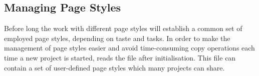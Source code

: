 \subsection{Managing Page Styles}
Before long the work with different page styles will establish a
common set of employed page styles, depending on taste and tasks.  In
order to make the management of page styles easier and avoid
time-consuming copy operations each time a new project is started,
 reads the file  after
initialisation.  This file can contain a set of user-defined page
styles which many projects can share.

\endinput


